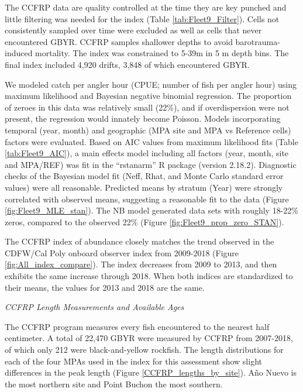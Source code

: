 \documentclass[12pt,]{article}
\begin{document}
The CCFRP data are quality controlled at the time they are key punched
and little filtering was needed for the index (Table
\ref{tab:Fleet9_Filter}). Cells not consistently sampled over time were
excluded as well as cells that never encountered GBYR. CCFRP samples
shallower depths to avoid barotrauma-induced mortality. The index was
constrained to 5-39m in 5 m depth bins. The final index included 4,920
drifts, 3,848 of which encountered GBYR.

We modeled catch per angler hour (CPUE; number of fish per angler hour)
using maximum likelihood and Bayesian negative binomial regression. The
proportion of zeroes in this data was relatively small (22\%), and if
overdispersion were not present, the regression would innately become
Poisson. Models incorporating temporal (year, month) and geographic (MPA
site and MPA vs Reference cells) factors were evaluated. Based on AIC
values from maximum likelihood fits (Table \ref{tab:Fleet9_AIC}), a main
effects model including all factors (year, month, site and MPA/REF) was
fit in the ``rstanarm'' R package (version 2.18.2). Diagnostic checks of
the Bayesian model fit (Neff, Rhat, and Monte Carlo standard error
values) were all reasonable. Predicted means by stratum (Year) were
strongly correlated with observed means, suggesting a reasonable fit to
the data (Figure \ref{fig:Fleet9_MLE_stan}). The NB model generated data
sets with roughly 18-22\% zeros, compared to the observed 22\% (Figure
\ref{fig:Fleet9_prop_zero_STAN}).

The CCFRP index of abundance closely matches the trend observed in the
CDFW/Cal Poly onboard observer index from 2009-2018 (Figure
\ref{fig:All_index_compare}). The index decreases from 2009 to 2013, and
then exhibits the same increase through 2018. When both indices are
standardized to their means, the values for 2013 and 2018 are the same.

\emph{CCFRP Length Measurements and Available Ages}

The CCFRP program measures every fish encountered to the nearest half
centimeter. A total of 22,470 GBYR were measured by CCFRP from
2007-2018, of which only 212 were black-and-yellow rockfish. The length
distributions for each of the four MPAs used in the index for this
assessment show slight differences in the peak length (Figure
\ref{CCFRP_lengths_by_site}). Año Nuevo is the most northern site and
Point Buchon the most southern.
\end{document}
